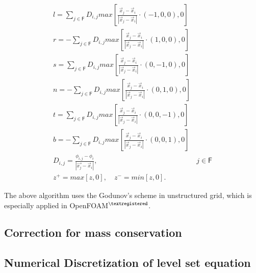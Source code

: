 \begin{equation}\label{25}
\begin{split}
l=\sum_{j\in{\mathsf{F}}}{D_{i,j}}max[\frac{\vec{x}_j-\vec{x}_i}{\left|{\vec{x}_j-\vec{x}_i}\right|}\cdot(-1,0,0),0]
\\
r=-\sum_{j\in{\mathsf{F}}}{D_{i,j}}max[\frac{\vec{x}_j-\vec{x}_i}{\left|{\vec{x}_j-\vec{x}_i}\right|}\cdot(1,0,0),0]
\\
s=\sum_{j\in{\mathsf{F}}}{D_{i,j}}max[\frac{\vec{x}_j-\vec{x}_i}{\left|{\vec{x}_j-\vec{x}_i}\right|}\cdot(0,-1,0),0]
\\
n=-\sum_{j\in{\mathsf{F}}}{D_{i,j}}max[\frac{\vec{x}_j-\vec{x}_i}{\left|{\vec{x}_j-\vec{x}_i}\right|}\cdot(0,1,0),0]
\\
t=\sum_{j\in{\mathsf{F}}}{D_{i,j}}max[\frac{\vec{x}_j-\vec{x}_i}{\left|{\vec{x}_j-\vec{x}_i}\right|}\cdot(0,0,-1),0]
\\
b=-\sum_{j\in{\mathsf{F}}}{D_{i,j}}max[\frac{\vec{x}_j-\vec{x}_i}{\left|{\vec{x}_j-\vec{x}_i}\right|}\cdot(0,0,1),0]
\\
D_{i,j}=\frac{\phi_{i,j}-\phi_i}{\left|{\vec{x_j}-\vec{x}_i}\right|}, & j\in{\mathsf{F}}
\\
z^+=max[z,0],\quad z^-=min[z,0].
\end{split}
\end{equation}

The above algorithm uses the Godunov's scheme in unstructured grid, which is especially applied in OpenFOAM$^{\textregistered}$.

\subsection{Correction for mass conservation}

\subsection{Numerical Discretization of level set equation}

